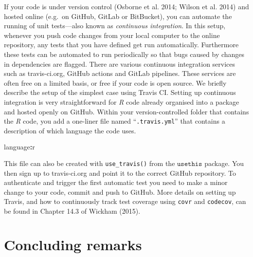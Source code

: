 \documentclass[]{elsarticle} %
\newenvironment{Shaded}{\begin{snugshade}}{\end{snugshade}}
\newcommand{\NormalTok}[1]{#1}
\newcommand{\OperatorTok}[1]{\textcolor[rgb]{0.81,0.36,0.00}{\textbf{#1}}}
\begin{document}
If your code is under version control (Osborne et al. 2014; Wilson et al. 2014) and hosted online (e.g.~on GitHub, GitLab or BitBucket), you can automate the running of unit tests---also known as \emph{continuous integration}.
In this setup, whenever you push code changes from your local computer to the online repository, any tests that you have defined get run automatically.
Furthermore these tests can be automated to run periodically so that bugs caused by changes in dependencies are flagged.
There are various continuous integration services such as travis-ci.org, GitHub actions and GitLab pipelines.
These services are often free on a limited basis, or free if your code is open source.
\newline
\newline
We briefly describe the setup of the simplest case using Travis CI.
Setting up continuous integration is very straightforward for \emph{R} code already organised into a package and hosted openly on GitHub.
Within your version-controlled folder that contains the \emph{R} code, you add a one-liner file named ``\texttt{.travis.yml}'' that contains a description of which language the code uses.
\newline
{}\label{travis}

\begin{Shaded}
\begin{Highlighting}[]
\NormalTok{language}\OperatorTok{:}\NormalTok{r}
\end{Highlighting}
\end{Shaded}

This file can also be created with \texttt{use\_travis()} from the \(\texttt{usethis}\) package.
You then sign up to travis-ci.org and point it to the correct GitHub repository.
To authenticate and trigger the first automatic test you need to make a minor change to your code, commit and push to GitHub.
More details on setting up Travis, and how to continuously track test coverage using \texttt{covr} and \texttt{codecov}, can be found in Chapter 14.3 of Wickham (2015).

\hypertarget{concluding-remarks}{%
\section{Concluding remarks}\label{concluding-remarks}}
\end{document}
